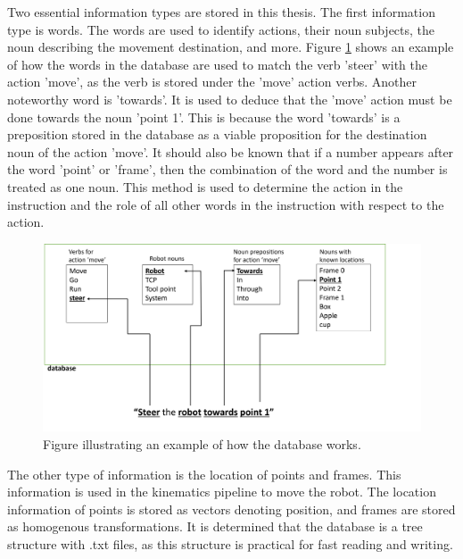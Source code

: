 Two essential information types are stored in this thesis. The first information type is words. The words are used to identify actions, their noun subjects, the noun describing the movement destination, and more. Figure \ref{fig:verb_sentence_move_box_PDF} shows an example of how the words in the database are used to match the verb 'steer' with the action 'move', as the verb is stored under the 'move' action verbs. Another noteworthy word is 'towards'. It is used to deduce that the 'move' action must be done towards the noun 'point 1'. This is because the word 'towards' is a preposition stored in the database as a viable proposition for the destination noun of the action 'move'. It should also be known that if a number appears after the word 'point' or 'frame', then the combination of the word and the number is treated as one noun.
This method is used to determine the action in the instruction and the role of all other words in the instruction with respect to the action.
\begin{figure}[ht]
    \centering
    \includegraphics[width=14cm]{img/database_example.png}
    \caption{Figure illustrating an example of how the database works.}
    \label{fig:verb_sentence_move_box_PDF}
\end{figure}
The other type of information is the location of points and frames. This information is used in the kinematics pipeline to move the robot. The location information of points is stored as vectors denoting position, and frames are stored as homogenous transformations.
It is determined that the database is a tree structure with .txt files, as this structure is practical for fast reading and writing.

